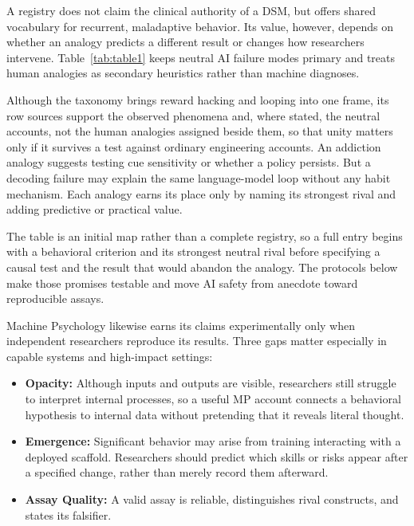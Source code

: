 \documentclass{article}
\begin{document}
A registry does not claim the clinical authority of a DSM, but offers shared vocabulary for recurrent, maladaptive behavior. Its value, however, depends on whether an analogy predicts a different result or changes how researchers intervene. Table~\ref{tab:table1} keeps neutral AI failure modes primary and treats human analogies as secondary heuristics rather than machine diagnoses.

Although the taxonomy brings reward hacking and looping into one frame, its row sources support the observed phenomena and, where stated, the neutral accounts, not the human analogies assigned beside them, so that unity matters only if it survives a test against ordinary engineering accounts. An addiction analogy suggests testing cue sensitivity or whether a policy persists. But a decoding failure may explain the same language-model loop without any habit mechanism. Each analogy earns its place only by naming its strongest rival and adding predictive or practical value.

The table is an initial map rather than a complete registry, so a full entry begins with a behavioral criterion and its strongest neutral rival before specifying a causal test and the result that would abandon the analogy. The protocols below make those promises testable and move AI safety from anecdote toward reproducible assays.

Machine Psychology likewise earns its claims experimentally only when independent researchers reproduce its results. Three gaps matter especially in capable systems and high-impact settings:
\begin{itemize}
    \item \textbf{Opacity:} Although inputs and outputs are visible, researchers still struggle to interpret internal processes, so a useful MP account connects a behavioral hypothesis to internal data without pretending that it reveals literal thought.
    \item \textbf{Emergence:} Significant behavior may arise from training interacting with a deployed scaffold. Researchers should predict which skills or risks appear after a specified change, rather than merely record them afterward.
    \item \textbf{Assay Quality:} A valid assay is reliable, distinguishes rival constructs, and states its falsifier.
\end{itemize}
\end{document}

